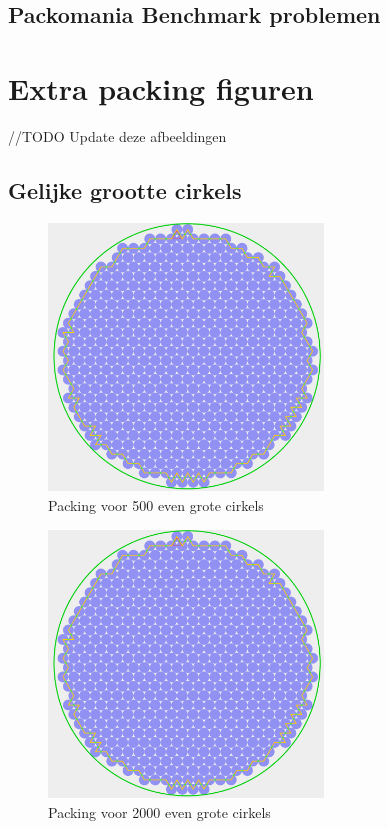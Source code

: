 \documentclass[12pt,a4paper,oneside]{book}
\begin{document}
\section{Packomania Benchmark problemen} \label{append:packomania-tabellen-benchmark}


\chapter{Extra packing figuren} \label{append:extra-packing-figuren}

//TODO Update deze afbeeldingen

\section{Gelijke grootte cirkels}

\begin{figure}
  \centering
  \includegraphics[width=0.65\textwidth]{packing-even-groot-500.png}
  \caption{Packing voor 500 even grote cirkels} \label{fig:packing-even-groot-500} 
\end{figure}

\begin{figure}
  \centering
  \includegraphics[width=0.65\textwidth]{packing-even-groot-2000.png}
  \caption{Packing voor 2000 even grote cirkels} \label{fig:packing-even-groot-2000} 
\end{figure}
\end{document}
